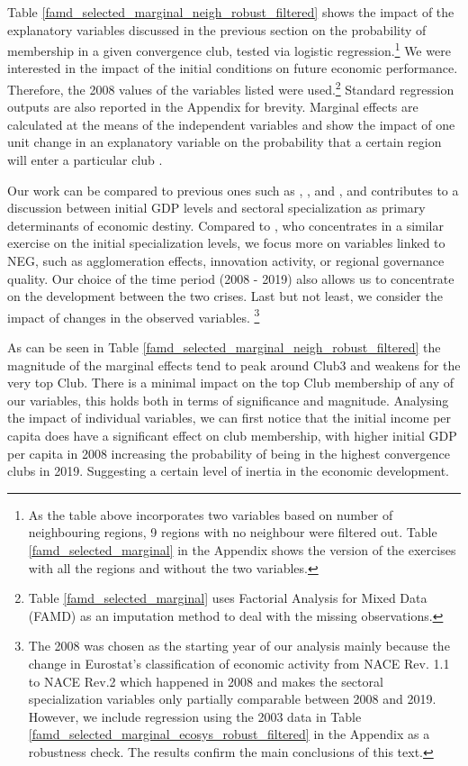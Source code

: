 \documentclass[11pt]{article}
\begin{document}
Table \ref{famd_selected_marginal_neigh_robust_filtered} shows the impact of the explanatory variables discussed in the previous section on the probability of membership in a given convergence club, tested via logistic regression.\footnote{As the table above incorporates two variables based on number of neighbouring regions, 9  regions with no neighbour were filtered out. Table \ref{famd_selected_marginal} in the Appendix shows the version of the exercises with all the regions and without the two variables.} We were interested in the impact of the initial conditions on future economic performance. Therefore, the 2008 values of the variables listed were used.\footnote{Table \ref{famd_selected_marginal} uses Factorial Analysis for Mixed Data (FAMD) as an imputation method to deal with the missing observations.}  Standard regression outputs are also reported in the Appendix for brevity. Marginal effects are calculated at the means of the independent variables and show the impact of one unit change in an explanatory variable on the probability that a certain region will enter a particular club \citep{carrolloglmx}.

Our work can be compared to previous ones such as \citet{cutrini2019economic}, \citet{von2017regional}, and \citet{bartkowska2012regional}, and contributes to a discussion between initial GDP levels and sectoral specialization as primary determinants of economic destiny. Compared to \citet{cutrini2019economic}, who concentrates in a similar exercise on the initial specialization levels, we focus more on variables linked to NEG, such as agglomeration effects, innovation activity, or regional governance quality. Our choice of the time period (2008 - 2019) also allows us to concentrate on the development between the two crises. Last but not least, we consider the impact of changes in the observed variables. \footnote{The 2008 was chosen as the starting year of our analysis mainly because the change in Eurostat's classification of economic activity from NACE Rev. 1.1 to NACE Rev.2 which happened in 2008 and makes the sectoral specialization variables only partially comparable between 2008 and 2019. However, we include regression using the 2003 data in Table \ref{famd_selected_marginal_ecosys_robust_filtered} in the Appendix as a robustness check. The results confirm the main conclusions of this text.}

As can be seen in Table \ref{famd_selected_marginal_neigh_robust_filtered} the magnitude of the marginal effects tend to peak around Club3 and weakens for the very top Club. There is a minimal impact on the top Club membership of any of our variables, this holds both in terms of significance and magnitude. 
Analysing the impact of individual variables, we can first notice that the initial income per capita does have a significant effect on club membership, with higher initial GDP per capita in 2008 increasing the probability of being in the highest convergence clubs in 2019. Suggesting a certain level of inertia in the economic development.
 
\end{document}
